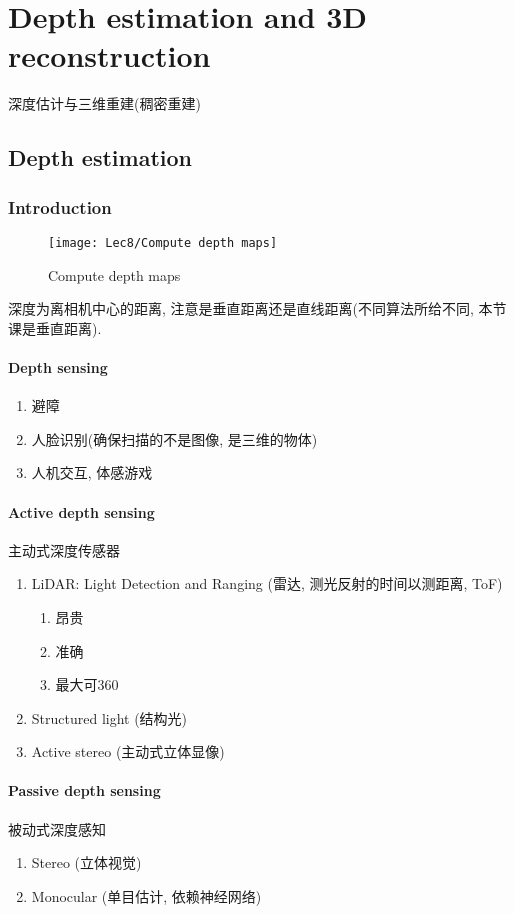 \chapter{Depth estimation and 3D reconstruction}
深度估计与三维重建(稠密重建)

\section{Depth estimation}
\subsection{Introduction}
\begin{figure}[H]
    \centering
    \texttt{[image: Lec8/Compute depth maps]}
    \caption{Compute depth maps}
\end{figure}

深度为离相机中心的距离, 注意是垂直距离还是直线距离(不同算法所给不同, 本节课是垂直距离). 

\subsubsection{Depth sensing}
\begin{enumerate}
    \item 避障
    \item 人脸识别(确保扫描的不是图像, 是三维的物体)
    \item 人机交互, 体感游戏
\end{enumerate}

\subsubsection{Active depth sensing}
主动式深度传感器
\begin{enumerate}
    \item LiDAR: Light Detection and Ranging (雷达, 测光反射的时间以测距离, ToF)
    \begin{enumerate}
        \item 昂贵
        \item 准确
        \item 最大可360\degree
    \end{enumerate}
    \item Structured light (结构光)
    \item Active stereo (主动式立体显像)
\end{enumerate}

\subsubsection{Passive depth sensing}
被动式深度感知
\begin{enumerate}
    \item Stereo (立体视觉)
    \item Monocular (单目估计, 依赖神经网络)
\end{enumerate}

